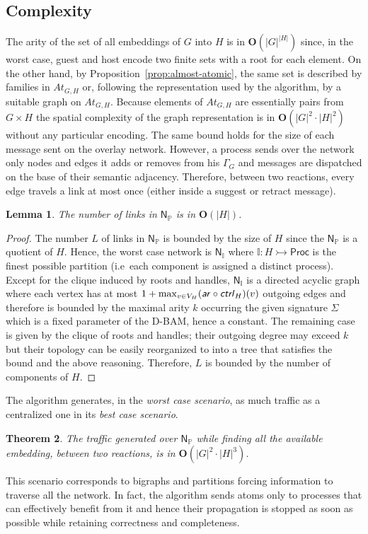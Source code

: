 \documentclass[a4paper,english,10pt]{article}
\theoremstyle{plain}\newtheorem{theorem}{Theorem}
\theoremstyle{plain}\newtheorem{corollary}[theorem]{Corollary}
\theoremstyle{plain}\newtheorem{proposition}[theorem]{Proposition}
\theoremstyle{plain}\newtheorem{lemma}[theorem]{Lemma}
\theoremstyle{plain}\newtheorem{definition}{Definition}
\theoremstyle{plain}\newtheorem{remark}{Remark}
\theoremstyle{plain}\newtheorem{example}[remark]{Example}
\newcommand{\?}[1]{}
\newcommand{\mono}{\rightarrowtail}
\newcommand{\ar}{\textsf{\textit{ar}}}
\newcommand{\ctrl}{\textsf{\textit{ctrl}}}
\newcommand{\mbb}[1]{\mathbb{#1}}
\newcommand{\prt}{\mbb}
\begin{document}
\subsection{Complexity} 

The arity of the set of all embeddings of $G$ into $H$ is 
in $\mathbf O(|G|^{|H|})$ since, in the worst case, guest and host
encode two finite sets with a root for each element. On the other hand,
by Proposition~\ref{prop:almost-atomic}, the same set is described by
families in $At_{G,H}$ or, following the representation used by the algorithm,
by a suitable graph on $At_{G,H}$. Because elements of $At_{G,H}$
are essentially pairs from $G \times H$ the spatial
complexity of the graph representation is in $\mathbf O(|G|^2\cdot|H|^2)$
without any particular encoding. The same bound holds for the size of
each message sent on the overlay network. 
However, a process sends over the network
only nodes and edges it adds or removes from his $\Gamma_G$ and messages
are dispatched on the base of their semantic adjacency. Therefore,
between two reactions, every edge travels a link at most once
(either inside a suggest or retract message). 

\begin{lemma}
	The number of links in  $\mathsf N_\prt P$ is in $\mathbf O(|H|)$.
\end{lemma}
\begin{proof}
	The number $L$ of links in $\mathsf N_\prt P$ is bounded
	by the size of $H$ since the $\mathsf N_\prt P$ is a quotient
	of $H$. Hence, the worst case network is $\mathsf N_\prt I$
	where $\prt I : H \mono \mathsf{Proc}$ is the finest possible
	partition (i.e~each component is assigned a distinct process).
Except for the clique induced by roots and handles,
	$\mathsf N_\prt I$ is a directed acyclic graph where
	each vertex has at most 
	$1 + \max_{v \in V_H }(\ar \circ \ctrl_H)(v)$ 
	outgoing edges and therefore is bounded by the maximal arity $k$
	occurring the given signature $\Sigma$ which is a fixed parameter
	of the D-BAM, hence a constant.
	The remaining case is given by the clique of roots and handles;
	their outgoing degree may exceed $k$ but their topology 
	can be easily reorganized to into a tree that satisfies the 
	bound and the above reasoning.
	Therefore, $L$ is bounded by the number of components of $H$.
\end{proof}

The algorithm generates, in the \emph{worst case scenario}, as much
traffic as a centralized one in its \emph{best case scenario}.
\begin{theorem}
	\label{thm:traffic}
	The traffic generated over $\mathsf N_\prt P$ while finding all the 
	available embedding,
	between two reactions, is in $\mathbf O(|G|^2\cdot|H|^3)$.
\end{theorem}
This scenario corresponds to bigraphs and partitions forcing information to
traverse all the network. In fact, the algorithm sends atoms only to
processes that can effectively benefit from it and hence their propagation
is stopped as soon as possible while retaining correctness and completeness.
\end{document}
